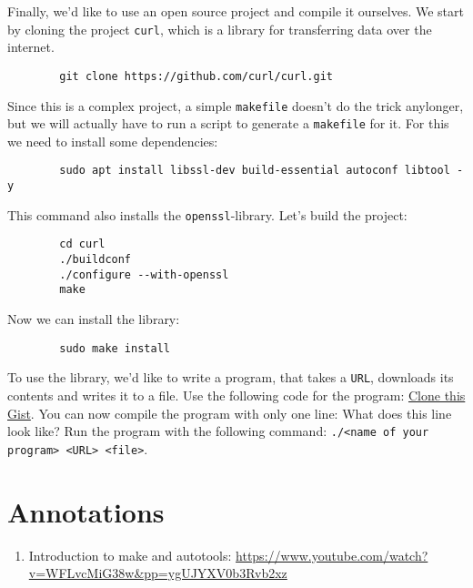 \documentclass{dcbl/challenge}
\begin{document}
\begin{aufgabe}
    Finally, we'd like to use an open source project and compile it ourselves. 
    We start by cloning the project \texttt{curl}, which is a library for transferring data over the internet.
    \begin{lstlisting}
        git clone https://github.com/curl/curl.git
    \end{lstlisting}
    Since this is a complex project, a simple \texttt{makefile} doesn't do the trick anylonger, but we will actually have to run a script to generate a \texttt{makefile} for it.
    For this we need to install some dependencies:
    \begin{lstlisting}
        sudo apt install libssl-dev build-essential autoconf libtool -y
    \end{lstlisting}
    This command also installs the \texttt{openssl}-library.
    Let's build the project:
    \begin{lstlisting}
        cd curl
        ./buildconf
        ./configure --with-openssl
        make
    \end{lstlisting}
    Now we can install the library:
    \begin{lstlisting}
        sudo make install
    \end{lstlisting}

    To use the library, we'd like to write a program, that takes a \texttt{URL}, downloads its contents and writes it to a file.
    Use the following code for the program: \href{https://gist.github.com/bjoekeldude/af6b9ff61d55a550f31aa22eb3e596ca}{Clone this Gist}.
    You can now compile the program with only one line: What does this line look like?
    Run the program with the following command: \texttt{./<name of your program> <URL> <file>}.
\end{aufgabe}


\section*{Annotations}
\begin{enumerate}
    \item Introduction to make and autotools: \url{https://www.youtube.com/watch?v=WFLvcMiG38w\&pp=ygUJYXV0b3Rvb2xz}
\end{enumerate}
\end{document}
